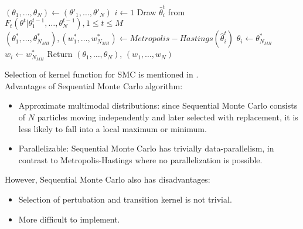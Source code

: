 \begin{algorithm}[H]
\begin{algorithmic}[1]
            \State $(\theta_1,\ldots,\theta_N) \leftarrow (\theta'_1,\ldots,\theta'_N)$
            \State $i \leftarrow 1$
             
            \State Draw $\hat{\theta}^t_i$ from $F_t(\theta^t | \theta^{t-1}_1,\ldots,\theta^{t-1}_N), 1\leq t \leq M$
            \State $(\theta^*_1,\ldots,\theta^*_{N_{MH}}), (w^*_1,\ldots,w^*_{N_{MH}}) \leftarrow Metropolis-Hastings(\hat{\theta}^t_i)$
            \State $\theta_i \leftarrow \theta^*_{N_{MH}}$
            \State $w_i \leftarrow w^*_{N_{MH}}$
            \EndWhile
            \EndWhile
            \State Return $(\theta_1,\ldots,\theta_{N})$, $(w_1,\ldots,w_{N})$
            \EndProcedure
      \end{algorithmic}
\end{algorithm}
Selection of kernel function for SMC is mentioned in \cite{silk2012optimizing}.\\
Advantages of Sequential Monte Carlo algorithm:
\begin{itemize}
      \item Approximate multimodal distributions: since Sequential Monte Carlo consists of $N$
            particles moving independently and later selected with replacement, it is less likely to fall
            into a local maximum or minimum.
      \item Parallelizable: Sequential Monte Carlo has trivially data-parallelism, in contrast to
            Metropolis-Hastings where no parallelization is possible.
\end{itemize}
However, Sequential Monte Carlo also has disadvantages:
\begin{itemize}
      \item Selection of pertubation and transition kernel is not trivial.
      \item More difficult to implement.
\end{itemize}

